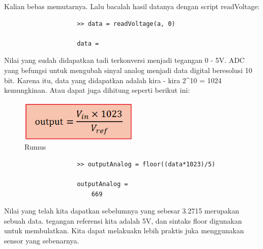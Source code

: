 \begin{enumerate}
				Kalian bebas memutarnya. Lalu bacalah hasil datanya dengan script readVoltage:
				
				\begin{verbatim}
					>> data = readVoltage(a, 0)
 
					data =
				\end{verbatim}
				Nilai yang sudah didapatkan tadi terkonversi menjadi tegangan 0 - 5V. ADC yang befungsi untuk mengubah sinyal analog menjadi data digital beresolusi 10 bit. Karena itu, data yang didapatkan adalah kira - kira 2^10 = 1024 kemungkinan. Atau dapat juga dihitung seperti berikut ini:
				
				\begin{figure}[ht]
					\centerline{\includegraphics[width=0.5\textwidth]{figures/rumus.png}}
					\caption{Rumus}
					\label{rumus}
				\end{figure}
				
				\begin{verbatim}
					>> outputAnalog = floor((data*1023)/5)
 
					outputAnalog =
						669
				\end{verbatim}
				
				Nilai yang telah kita dapatkan sebelumnya yang sebesar 3.2715 merupakan sebuah data. tegangan referensi kita adalah 5V, dan sintaks floor digunakan untuk membulatkan. Kita dapat melakuakn lebih praktis juka menggunakan sensor yang sebenarnya.
		\end{enumerate}
		
\cite{steiner2009firmata}
